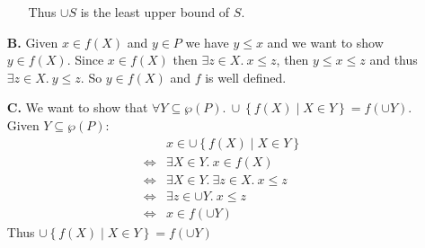 \begin{exercise}
\begin{enumerate}
\begin{itemize}
                    Thus $\cup S$ is the least upper bound of $S$.
            \end{itemize}
        \item[\textbf{B.}]
            Given $x \in f(X)$ and $y \in P$ we have $y \leq x$ and we want to show $y \in f(X)$. Since $x \in f(X)$ then $\exists z \in X.\ x \leq z$, then $y \leq x \leq z$ and thus $\exists z \in X.\ y \leq z$. So $y \in f(X)$ and $f$ is well defined.
        \item[\textbf{C.}]
            We want to show that $\forall Y \subseteq \wp(P).\ \cup \left\{f(X) \mid X \in Y\right\} = f(\cup Y)$. Given $Y \subseteq \wp(P)$:
            \begin{align*}
                &x \in \cup \left\{f(X) \mid X \in Y\right\} \\
                \iff& \exists X \in Y.\ x \in f(X) \\
                \iff& \exists X \in Y.\ \exists z \in X.\ x \leq z \\
                \iff& \exists z \in \cup Y.\ x \leq z \\
                \iff& x \in f(\cup Y)
            \end{align*}
            Thus $\cup \left\{f(X) \mid X \in Y\right\} = f(\cup Y)$
    \end{enumerate}
\end{exercise}
